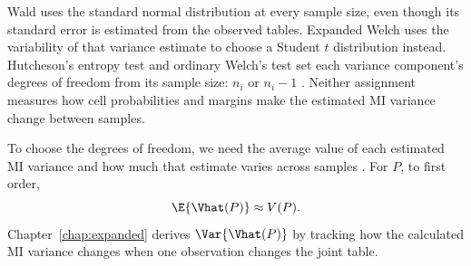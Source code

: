 \medskip
{}

Wald uses the standard normal distribution at every sample size, even
though its standard error is estimated from the observed tables. Expanded
Welch uses the variability of that variance estimate to choose a Student
\(t\) distribution instead.
Hutcheson's entropy test and ordinary Welch's test
set each variance component's degrees of freedom from its sample size:
\(n_i\) \citep{hutcheson1970} or \(n_i-1\) \citep{welch1947}. Neither assignment
measures how cell probabilities and margins make the estimated MI variance
change between samples.

To choose the degrees of freedom, we need the average value of each estimated
MI variance and how much that estimate varies across samples
\citep{satterthwaite1946}. For \(P\), to first order,
\begin{equation}
  \E\{\Vhat(P)\}\approx V(P).
\end{equation}
Chapter~\ref{chap:expanded} derives
\(\Var\{\Vhat(P)\}\) by tracking how the calculated MI variance changes
when one observation changes the joint table.
